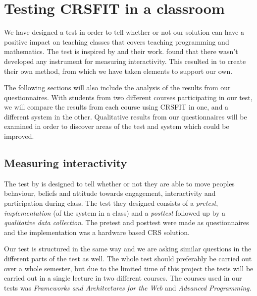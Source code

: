 
\section{Testing CRSFIT in a classroom}\label{sec:testingcrs}
We have designed a test in order to tell whether or not our solution can have a positive impact on teaching classes that covers teaching programming and mathematics. The test is inspired by \cite{siau2006use} and their work.  found that there wasn't developed any instrument for measuring interactivity. This resulted in  to create their own method, from which we have taken elements to support our own.

The following sections will also include the analysis of the results from our questionnaires. With students from two different courses participating in our test, we will compare the results from each course using CRSFIT in one, and a different system in the other. Qualitative results from our questionnaires will be examined in order to discover areas of the test and system which could be improved.


\subsection{Measuring interactivity}
The test by  is designed to tell whether or not they are able to move peoples behaviour, beliefs and attitude towards engagement, interactivity and participation during class. The test they designed consists of a \emph{pretest}, \emph{implementation} (of the system in a class) and a \emph{posttest} followed up by a \emph{qualitative data collection}. The pretest and posttest were made as questionnaires and the implementation was a hardware based CRS solution.

Our test is structured in the same way and we are asking similar questions in the different parts of the test as well. The whole test should preferably be carried out over a whole semester, but due to the limited time of this project the tests will be carried out in a single lecture in two different courses. The courses used in our tests was \emph{Frameworks and Architectures for the Web} and \emph{Advanced Programming}.

